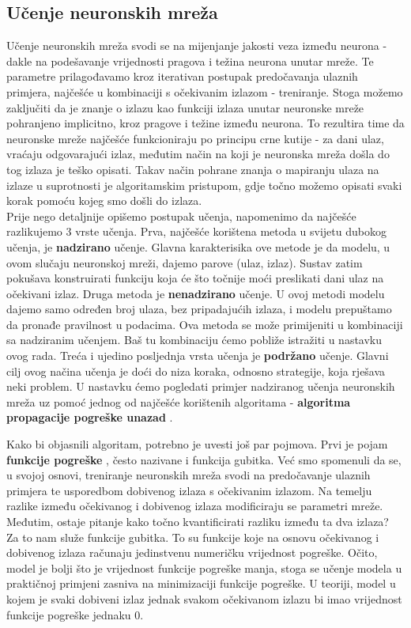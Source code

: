 \noindent 


\subsection{Učenje neuronskih mreža}
Učenje neuronskih mreža svodi se na mijenjanje jakosti veza između neurona - dakle na podešavanje vrijednosti pragova i težina neurona unutar mreže. Te parametre prilagođavamo kroz iterativan postupak predočavanja ulaznih primjera, najčešće u kombinaciji s očekivanim izlazom - treniranje. Stoga možemo zaključiti da je znanje o izlazu kao funkciji izlaza unutar neuronske mreže pohranjeno implicitno, kroz pragove i težine između neurona. To rezultira time da neuronske mreže najčešće funkcioniraju po principu crne kutije - za dani ulaz, vraćaju odgovarajući izlaz, međutim način na koji je neuronska mreža došla do tog izlaza je teško opisati. Takav način pohrane znanja o mapiranju ulaza na izlaze u suprotnosti je algoritamskim pristupom, gdje točno možemo opisati svaki korak pomoću kojeg smo došli do izlaza.\citep{neuronskeMreze2008FER} \\

\noindent Prije nego detaljnije opišemo postupak učenja, napomenimo da najčešće razlikujemo 3 vrste učenja. Prva, najčešće korištena metoda u svijetu dubokog učenja, je \textbf{nadzirano}  učenje. Glavna karakterisika ove metode je da modelu, u ovom slučaju neuronskoj mreži, dajemo parove (ulaz, izlaz). Sustav zatim pokušava konstruirati funkciju koja će što točnije moći preslikati dani ulaz na očekivani izlaz. Druga metoda je \textbf{nenadzirano}  učenje. U ovoj metodi modelu dajemo samo određen broj ulaza, bez pripadajućih izlaza, i modelu prepuštamo da pronađe pravilnost u podacima. Ova metoda se može primijeniti u kombinaciji sa nadziranim učenjem. Baš tu kombinaciju ćemo pobliže istražiti u nastavku ovog rada. Treća i ujedino posljednja vrsta učenja je \textbf{podržano}  učenje. Glavni cilj ovog načina učenja je doći do niza koraka, odnosno strategije, koja rješava neki problem. 
U nastavku ćemo pogledati primjer nadziranog učenja neuronskih mreža uz pomoć jednog od najčešće korištenih algoritama - \textbf{algoritma propagacije pogreške unazad} .

Kako bi objasnili algoritam, potrebno je uvesti još par pojmova. Prvi je pojam \textbf{funkcije pogreške} , često nazivane i funkcija gubitka. Već smo spomenuli da se, u svojoj osnovi, treniranje neuronskih mreža svodi na predočavanje ulaznih primjera te usporedbom dobivenog izlaza s očekivanim izlazom. Na temelju razlike između očekivanog i dobivenog izlaza modificiraju se parametri mreže. Međutim, ostaje pitanje kako točno kvantificirati razliku između ta dva izlaza? Za to nam služe funkcije gubitka. To su funkcije koje na osnovu očekivanog i dobivenog izlaza računaju jedinstvenu numeričku vrijednost pogreške. Očito, model je bolji što je vrijednost funkcije pogreške manja, stoga se učenje modela u praktičnoj primjeni zasniva na minimizaciji funkcije pogreške. U teoriji, model u kojem je svaki dobiveni izlaz jednak svakom očekivanom izlazu bi imao vrijednost funkcije pogreške jednaku 0.

